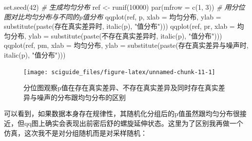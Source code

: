\documentclass[]{tufte-book}
\newenvironment{Shaded}{}{}
\newcommand{\AttributeTok}[1]{\textcolor[rgb]{0.49,0.56,0.16}{#1}}
\newcommand{\CommentTok}[1]{\textcolor[rgb]{0.38,0.63,0.69}{\textit{#1}}}
\newcommand{\DecValTok}[1]{\textcolor[rgb]{0.25,0.63,0.44}{#1}}
\newcommand{\FunctionTok}[1]{\textcolor[rgb]{0.02,0.16,0.49}{#1}}
\newcommand{\NormalTok}[1]{#1}
\newcommand{\OtherTok}[1]{\textcolor[rgb]{0.00,0.44,0.13}{#1}}
\newcommand{\StringTok}[1]{\textcolor[rgb]{0.25,0.44,0.63}{#1}}
\begin{document}
\begin{Shaded}
\begin{Highlighting}[]
\FunctionTok{set.seed}\NormalTok{(}\DecValTok{42}\NormalTok{)}
\CommentTok{\# 生成均匀分布}
\NormalTok{ref }\OtherTok{\textless{}{-}} \FunctionTok{runif}\NormalTok{(}\DecValTok{10000}\NormalTok{)}
\FunctionTok{par}\NormalTok{(}\AttributeTok{mfrow =} \FunctionTok{c}\NormalTok{(}\DecValTok{1}\NormalTok{, }\DecValTok{3}\NormalTok{))}
\CommentTok{\# 用分位图对比均匀分布与不同的p值分布}
\FunctionTok{qqplot}\NormalTok{(ref, p, }\AttributeTok{xlab =} \StringTok{\textquotesingle{}均匀分布\textquotesingle{}}\NormalTok{, }\AttributeTok{ylab =} \FunctionTok{substitute}\NormalTok{(}\FunctionTok{paste}\NormalTok{(}\StringTok{\textquotesingle{}存在真实差异时\textquotesingle{}}\NormalTok{, }\FunctionTok{italic}\NormalTok{(}\StringTok{\textquotesingle{}p\textquotesingle{}}\NormalTok{), }\StringTok{"值分布"}\NormalTok{)))}
\FunctionTok{qqplot}\NormalTok{(ref, pr, }\AttributeTok{xlab =} \StringTok{\textquotesingle{}均匀分布\textquotesingle{}}\NormalTok{, }\AttributeTok{ylab =} \FunctionTok{substitute}\NormalTok{(}\FunctionTok{paste}\NormalTok{(}\StringTok{\textquotesingle{}不存在真实差异时\textquotesingle{}}\NormalTok{, }\FunctionTok{italic}\NormalTok{(}\StringTok{\textquotesingle{}p\textquotesingle{}}\NormalTok{), }\StringTok{"值分布"}\NormalTok{)))}
\FunctionTok{qqplot}\NormalTok{(ref, pm, }\AttributeTok{xlab =} \StringTok{\textquotesingle{}均匀分布\textquotesingle{}}\NormalTok{, }\AttributeTok{ylab =} \FunctionTok{substitute}\NormalTok{(}\FunctionTok{paste}\NormalTok{(}\StringTok{\textquotesingle{}存在真实差异与噪声时\textquotesingle{}}\NormalTok{, }\FunctionTok{italic}\NormalTok{(}\StringTok{\textquotesingle{}p\textquotesingle{}}\NormalTok{), }\StringTok{"值分布"}\NormalTok{)))}
\end{Highlighting}
\end{Shaded}

\begin{figure}
\texttt{[image: sciguide\_files/figure-latex/unnamed-chunk-11-1]} \caption[分位图观察p值在存在真实差异、不存在真实差异及同时存在真实差异与噪声的分布跟均匀分布的区别]{分位图观察p值在存在真实差异、不存在真实差异及同时存在真实差异与噪声的分布跟均匀分布的区别}\label{fig:unnamed-chunk-11}
\end{figure}

可以看到，如果数据本身存在规律性，其随机化分组后的p值虽然跟均匀分布很接近，但qq图上确实会表现出前密后舒的螺旋延伸状态。这里为了区别我再做一个仿真，这次我不是对分组随机而是对采样随机：
\end{document}
